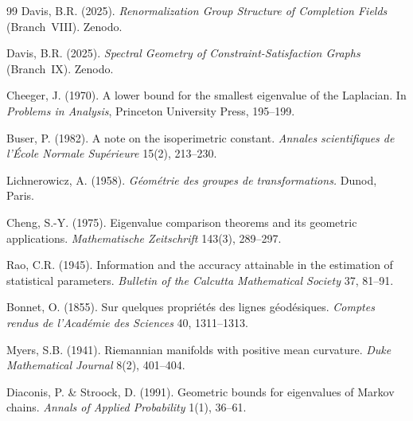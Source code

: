 \documentclass[11pt]{article}
\theoremstyle{remark}
\begin{document}
\begin{thebibliography}{99}
Davis, B.R. (2025).
\emph{Renormalization Group Structure of Completion Fields} (Branch~VIII).
Zenodo.

Davis, B.R. (2025).
\emph{Spectral Geometry of Constraint-Satisfaction Graphs} (Branch~IX).
Zenodo.

Cheeger, J. (1970).
A lower bound for the smallest eigenvalue of the Laplacian.
In \emph{Problems in Analysis}, Princeton University Press, 195--199.

Buser, P. (1982).
A note on the isoperimetric constant.
\emph{Annales scientifiques de l'\'Ecole Normale Sup\'erieure} 15(2), 213--230.

Lichnerowicz, A. (1958).
\emph{G\'eom\'etrie des groupes de transformations.}
Dunod, Paris.

Cheng, S.-Y. (1975).
Eigenvalue comparison theorems and its geometric applications.
\emph{Mathematische Zeitschrift} 143(3), 289--297.

Rao, C.R. (1945).
Information and the accuracy attainable in the estimation of statistical
parameters.
\emph{Bulletin of the Calcutta Mathematical Society} 37, 81--91.

Bonnet, O. (1855).
Sur quelques propri\'et\'es des lignes g\'eod\'esiques.
\emph{Comptes rendus de l'Acad\'emie des Sciences} 40, 1311--1313.

Myers, S.B. (1941).
Riemannian manifolds with positive mean curvature.
\emph{Duke Mathematical Journal} 8(2), 401--404.

Diaconis, P. \& Stroock, D. (1991).
Geometric bounds for eigenvalues of Markov chains.
\emph{Annals of Applied Probability} 1(1), 36--61.

\end{thebibliography}
\end{document}
